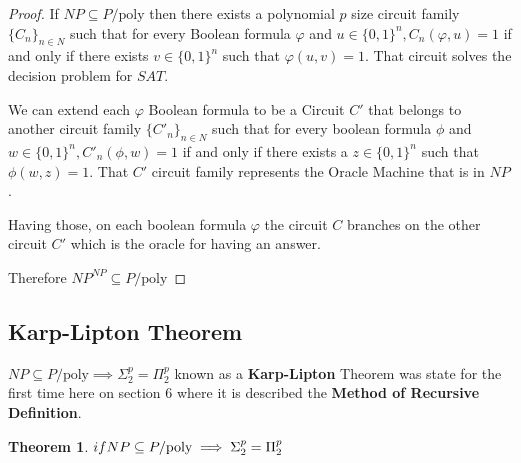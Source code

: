 \documentclass[12pt, a4paper]{article}
\begin{document}
\begin{proof}
  If $NP \subseteq P/\text{poly}$ then there exists a polynomial $p$ size circuit family $\{C_n\}_{n \in N}$ such that for every Boolean formula $\varphi$ and $u \in \{0,1\}^n, C_n(\varphi, u) = 1$ if and only if there exists $v \in \{0,1\}^n$ such that $\varphi(u, v) = 1$. That circuit solves the decision problem for $SAT$.

  We can extend each $\varphi$ Boolean formula to be a Circuit $C'$ that belongs to another circuit family $\{C'_n\}_{n \in N}$ such that for every boolean formula $\phi$ and $w \in \{0,1\}^n, C'_n(\phi, w) = 1$ if and only if there exists a $z \in \{0,1\}^n$ such that $\phi(w,z) = 1$. That $C'$ circuit family represents the Oracle Machine that is in $NP$.

  Having those, on each boolean formula $\varphi$ the circuit $C$ branches on the other circuit $C'$ which is the oracle for having an answer.

  Therefore $NP^{NP} \subseteq P/\text{poly}$

\end{proof}

\subsection{Karp-Lipton Theorem}
$NP \subseteq P/\text{poly} \implies \Sigma_2^p = \Pi_2^p$ known as a \textbf{Karp-Lipton} Theorem was state for the first time here \cite{karp} on section 6 where it is described the \textbf{Method of Recursive Definition}.

\newtheorem{polycollapse}{Theorem}
\begin{polycollapse}
  $\\if NP \subseteq P/\text{poly} \implies \Sigma_2^p = \Pi_2^p$
\end{polycollapse}
\end{document}

